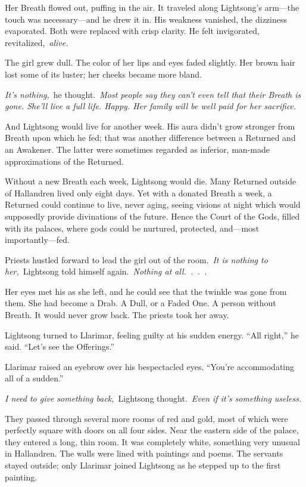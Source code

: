 Her Breath flowed out, puffing in the air. It traveled along Lightsong’s arm—the touch was necessary—and he drew it in. His weakness vanished, the dizziness evaporated. Both were replaced with crisp clarity. He felt invigorated, revitalized,~\textit{alive.}

The girl grew dull. The color of her lips and eyes faded slightly. Her brown hair lost some of its luster; her cheeks became more bland.

\textit{It’s nothing,}~he thought.~\textit{Most people say they can’t even tell that their Breath is gone. She’ll live a full life. Happy. Her family will be well paid for her sacrifice.}

And Lightsong would live for another week. His aura didn’t grow stronger from Breath upon which he fed; that was another difference between a Returned and an Awakener. The latter were sometimes regarded as inferior, man-made approximations of the Returned.

Without a new Breath each week, Lightsong would die. Many Returned outside of Hallandren lived only eight days. Yet with a donated Breath a week, a Returned could continue to live, never aging, seeing visions at night which would supposedly provide divinations of the future. Hence the Court of the Gods, filled with its palaces, where gods could be nurtured, protected, and—most importantly—fed.

Priests hustled forward to lead the girl out of the room.~\textit{It is nothing to her,}~Lightsong told himself again.~\textit{Nothing at all.~.~.~.}

Her eyes met his as she left, and he could see that the twinkle was gone from them. She had become a Drab. A Dull, or a Faded One. A person without Breath. It would never grow back. The priests took her away.

Lightsong turned to Llarimar, feeling guilty at his sudden energy. “All right,” he said. “Let’s see the Offerings.”

Llarimar raised an eyebrow over his bespectacled eyes. “You’re accommodating all of a sudden.”

\textit{I need to give something back,}~Lightsong thought.~\textit{Even if it’s something useless.}

They passed through several more rooms of red and gold, most of which were perfectly square with doors on all four sides. Near the eastern side of the palace, they entered a long, thin room. It was completely white, something very unusual in Hallandren. The walls were lined with paintings and poems. The servants stayed outside; only Llarimar joined Lightsong as he stepped up to the first painting.

